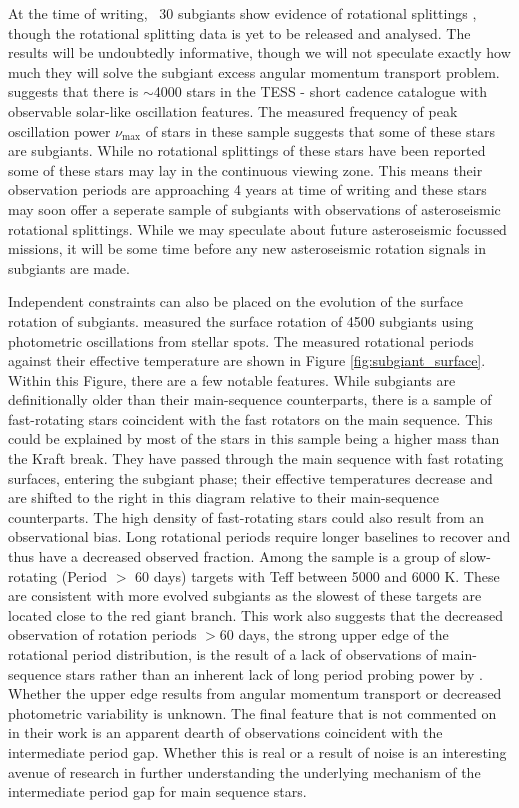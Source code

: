 At the time of writing, ~30 subgiants show evidence of rotational splittings \citep{li_asteroseismology_2020,li_asteroseismology_2020-1}, though the rotational splitting data is yet to be released and analysed.
The results will be undoubtedly informative, though we will not speculate exactly how much they will solve the subgiant excess angular momentum transport problem.
\citet{hatt_catalogue_2023} suggests that there is $\sim$4000 stars in the TESS - short cadence catalogue with observable solar-like oscillation features.
The measured frequency of peak oscillation power $\nu_{\text{max}}$ of stars in these sample suggests that some of these stars are subgiants.
While no rotational splittings of these stars have been reported some of these stars may lay in the continuous viewing zone.
This means their observation periods are approaching 4 years at time of writing and these stars may soon offer a seperate sample of subgiants with observations of asteroseismic rotational splittings.
While we may speculate about future asteroseismic focussed missions, it will be some time before any new asteroseismic rotation signals in subgiants are made.

Independent constraints can also be placed on the evolution of the surface rotation of subgiants.
\citet{santos_surface_2021} measured the surface rotation of 4500 subgiants using photometric oscillations from stellar spots.
The measured rotational periods against their effective temperature are shown in Figure \ref{fig:subgiant_surface}.
Within this Figure, there are a few notable features.
While subgiants are definitionally older than their main-sequence counterparts, there is a sample of fast-rotating stars coincident with the fast rotators on the main sequence.
This could be explained by most of the stars in this sample being a higher mass than the Kraft break.
They have passed through the main sequence with fast rotating surfaces, entering the subgiant phase; their effective temperatures decrease and are shifted to the right in this diagram relative to their main-sequence counterparts.
The high density of fast-rotating stars could also result from an observational bias.
Long rotational periods require longer baselines to recover and thus have a decreased observed fraction.
Among the sample is a group of slow-rotating (Period $>$ 60 days) targets with Teff between 5000 and 6000 K.
These are consistent with more evolved subgiants as the slowest of these targets are located close to the red giant branch.
This work also suggests that the decreased observation of rotation periods $>$60 days, the strong upper edge of the \citet{mcquillan_rotation_2014} rotational period distribution, is the result of a lack of observations of main-sequence stars rather than an inherent lack of long period probing power by \kepler. 
Whether the upper edge results from angular momentum transport or decreased photometric variability is unknown.
The final feature that is not commented on in their work is an apparent dearth of observations coincident with the intermediate period gap.
Whether this is real or a result of noise is an interesting avenue of research in further understanding the underlying mechanism of the intermediate period gap for main sequence stars.

